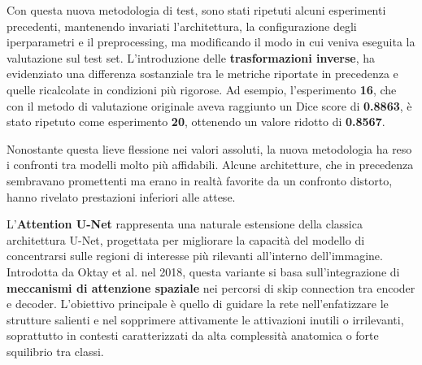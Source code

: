 
Con questa nuova metodologia di test, sono stati ripetuti alcuni esperimenti precedenti, mantenendo invariati l’architettura, la configurazione degli iperparametri e il preprocessing, ma modificando il modo in cui veniva eseguita la valutazione sul test set. L’introduzione delle \textbf{trasformazioni inverse}, ha evidenziato una differenza sostanziale tra le metriche riportate in precedenza e quelle ricalcolate in condizioni più rigorose. Ad esempio, l’esperimento \textbf{16}, che con il metodo di valutazione originale aveva raggiunto un Dice score di \textbf{0.8863}, è stato ripetuto come esperimento \textbf{20}, ottenendo un valore ridotto di \textbf{0.8567}. 

Nonostante questa lieve flessione nei valori assoluti, la nuova metodologia ha reso i confronti tra modelli molto più affidabili. Alcune architetture, che in precedenza sembravano promettenti ma erano in realtà favorite da un confronto distorto, hanno rivelato prestazioni inferiori alle attese. %


L’\textbf{Attention U-Net} rappresenta una naturale estensione della classica architettura U-Net, progettata per migliorare la capacità del modello di concentrarsi sulle regioni di interesse più rilevanti all’interno dell’immagine. Introdotta da Oktay et al. nel 2018, questa variante si basa sull’integrazione di \textbf{meccanismi di attenzione spaziale} nei percorsi di skip connection tra encoder e decoder. L’obiettivo principale è quello di guidare la rete nell’enfatizzare le strutture salienti e nel sopprimere attivamente le attivazioni inutili o irrilevanti, soprattutto in contesti caratterizzati da alta complessità anatomica o forte squilibrio tra classi.

